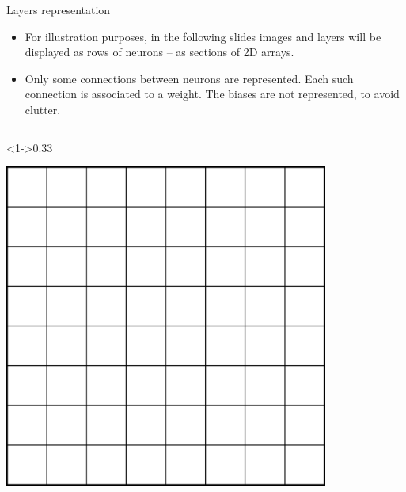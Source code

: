 \documentclass[xcolor=pdftex,dvipsnames,table,mathserif]{beamer}
\begin{document}
\begin{frame}{Layers representation}

  \begin{block}{}
    \begin{itemize}
    \item     For illustration purposes, in the following slides images and layers will be displayed as rows of neurons -- as sections of 2D arrays.
    \item     Only some connections between neurons are represented. Each such connection is associated to a weight. The biases are not represented, to avoid clutter.
    \end{itemize}

  \end{block}

  \begin{columns}

    \begin{column}<1->{0.33\textwidth}
      \begin{center}
        \includegraphics[width=0.80\textwidth]{cnn_pixels.png}
      \end{center}
    \end{column}


\end{columns}
\end{frame}
\end{document}
